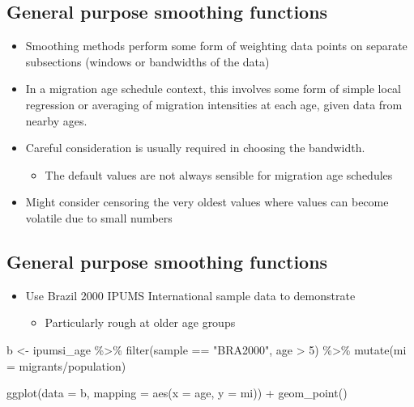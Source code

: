 \documentclass[
]{book}
\newenvironment{Shaded}{\begin{snugshade}}{\end{snugshade}}
\newcommand{\AttributeTok}[1]{\textcolor[rgb]{0.77,0.63,0.00}{#1}}
\newcommand{\DecValTok}[1]{\textcolor[rgb]{0.00,0.00,0.81}{#1}}
\newcommand{\FunctionTok}[1]{\textcolor[rgb]{0.00,0.00,0.00}{#1}}
\newcommand{\NormalTok}[1]{#1}
\newcommand{\OtherTok}[1]{\textcolor[rgb]{0.56,0.35,0.01}{#1}}
\newcommand{\SpecialCharTok}[1]{\textcolor[rgb]{0.00,0.00,0.00}{#1}}
\newcommand{\StringTok}[1]{\textcolor[rgb]{0.31,0.60,0.02}{#1}}
\providecommand{\tightlist}{%
  \setlength{\itemsep}{0pt}\setlength{\parskip}{0pt}}
\begin{document}
\hypertarget{general-purpose-smoothing-functions-1}{%
\subsection{General purpose smoothing functions}\label{general-purpose-smoothing-functions-1}}

\begin{itemize}
\tightlist
\item
  Smoothing methods perform some form of weighting data points on separate subsections (windows or bandwidths of the data)
\item
  In a migration age schedule context, this involves some form of simple local regression or averaging of migration intensities at each age, given data from nearby ages.
\item
  Careful consideration is usually required in choosing the bandwidth.

  \begin{itemize}
  \tightlist
  \item
    The default values are not always sensible for migration age schedules
  \end{itemize}
\item
  Might consider censoring the very oldest values where values can become volatile due to small numbers
\end{itemize}

\hypertarget{general-purpose-smoothing-functions-2}{%
\subsection{General purpose smoothing functions}\label{general-purpose-smoothing-functions-2}}

\begin{itemize}
\tightlist
\item
  Use Brazil 2000 IPUMS International sample data to demonstrate

  \begin{itemize}
  \tightlist
  \item
    Particularly rough at older age groups
  \end{itemize}
\end{itemize}

\begin{Shaded}
\begin{Highlighting}[]
\NormalTok{b }\OtherTok{\textless{}{-}}\NormalTok{ ipumsi\_age }\SpecialCharTok{\%\textgreater{}\%}
  \FunctionTok{filter}\NormalTok{(sample }\SpecialCharTok{==} \StringTok{"BRA2000"}\NormalTok{,}
\NormalTok{         age }\SpecialCharTok{\textgreater{}} \DecValTok{5}\NormalTok{) }\SpecialCharTok{\%\textgreater{}\%}
  \FunctionTok{mutate}\NormalTok{(}\AttributeTok{mi =}\NormalTok{ migrants}\SpecialCharTok{/}\NormalTok{population)  }

\FunctionTok{ggplot}\NormalTok{(}\AttributeTok{data =}\NormalTok{ b, }\AttributeTok{mapping =} \FunctionTok{aes}\NormalTok{(}\AttributeTok{x =}\NormalTok{ age, }\AttributeTok{y =}\NormalTok{ mi)) }\SpecialCharTok{+}
  \FunctionTok{geom\_point}\NormalTok{() }
\end{Highlighting}
\end{Shaded}
\end{document}
